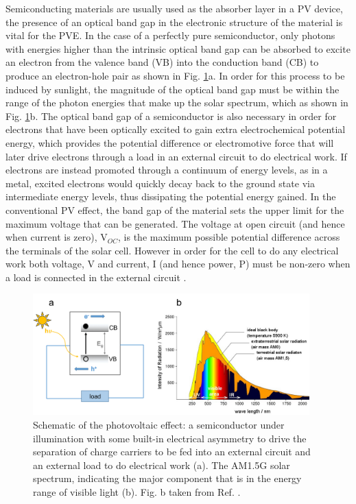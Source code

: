 \documentclass[11pt, twoside]{report}
\begin{document}
Semiconducting materials are usually used as the absorber layer in a PV device, the presence of an optical band gap in the electronic structure of the material is vital for the PVE. In the case of a perfectly pure semiconductor, only photons with energies higher than the intrinsic optical band gap can be absorbed to excite an electron from the valence band (VB) into the conduction band (CB) to produce an electron-hole pair as shown in Fig. \ref{PV_schematic}a. In order for this process to be induced by sunlight, the magnitude of the optical band gap must be within the range of the photon energies that make up the solar spectrum, which as shown in Fig. \ref{PV_schematic}b. The optical band gap of a semiconductor is also necessary in order for electrons that have been optically excited to gain extra electrochemical potential energy, which provides the potential difference or electromotive force that will later drive electrons through a load in an external circuit to do electrical work. If electrons are instead promoted through a continuum of energy levels, as in a metal, excited electrons would quickly decay back to the ground state via intermediate energy levels, thus dissipating the potential energy gained. In the conventional PV effect, the band gap of the material sets the upper limit for the maximum voltage that can be generated. The voltage at open circuit (and hence when current is zero), V$_{OC}$, is the maximum possible potential difference across the terminals of the solar cell. However in order for the cell to do any electrical work both voltage, V and current, I (and hence power, P) must be non-zero when a load is connected in the external circuit \cite{Nelson3}.

\begin{figure}[h!]
  \centering
    \includegraphics[width=0.95\textwidth]{figures/PV_schematic.png}
    \caption[Schematic of the photovoltaic effect: a semiconductor under illumination with some built-in electrical asymmetry to drive the separation of charge carriers to be fed into an external circuit and an external load to do electrical work (a). The AM1.5G solar spectrum, indicating the major component that is in the energy range of visible light (b).]{Schematic of the photovoltaic effect: a semiconductor under illumination with some built-in electrical asymmetry to drive the separation of charge carriers to be fed into an external circuit and an external load to do electrical work (a). The AM1.5G solar spectrum, indicating the major component that is in the energy range of visible light (b). Fig. b taken from Ref. .}
  \label{PV_schematic}
\end{figure}
\end{document}
